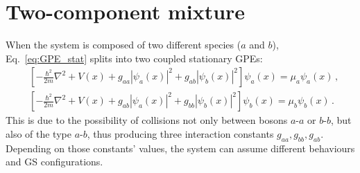 \section{Two-component mixture}
When the system is composed of two different species ($a$ and $b$), Eq.\ \eqref{eq:GPE_stat} splits into two coupled stationary GPEs:
\begin{equation}
    \begin{aligned}
        &\left[ -\frac{\hbar^2}{2m}\nabla^2 + V(x) + g_{aa}|\psi_a(x)|^2 + g_{ab}|\psi_b(x)|^2
        \right] \psi_a(x) = \mu_a \psi_a(x)\, , \\
        &\left[ -\frac{\hbar^2}{2m}\nabla^2 + V(x) + g_{ab}|\psi_a(x)|^2 + g_{bb}|\psi_b(x)|^2
        \right] \psi_b(x) = \mu_b \psi_b(x)\, .
    \end{aligned}
    \label{eq:GPE_two}
\end{equation}
This is due to the possibility of collisions not only between bosons $a$-$a$ or $b$-$b$, but also of the type $a$-$b$, thus producing three interaction constants $g_{aa}, g_{bb}, g_{ab}$. Depending on those constants' values, the system can assume different behaviours and GS configurations. 

